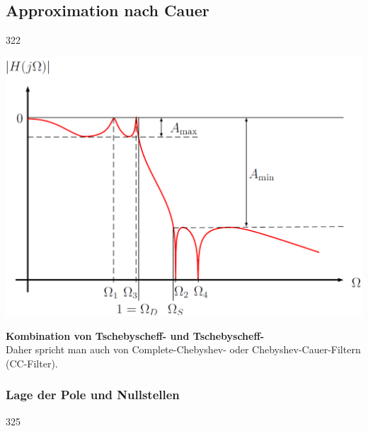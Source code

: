 \subsection{Approximation nach Cauer}{322}

\begin{minipage}[c]{0.45\columnwidth}
    \includegraphics[width=\columnwidth]{images/filter_cauer_amplitudengang.png}
\end{minipage}
\hfill
\begin{minipage}[c]{0.48\columnwidth}
    \textbf{Kombination von Tschebyscheff- und Tschebyscheff-} \\

    Daher spricht man auch von Complete-Chebyshev- oder Chebyshev-Cauer-Filtern (CC-Filter).
\end{minipage}


\subsubsection{Lage der Pole und Nullstellen}{325}

